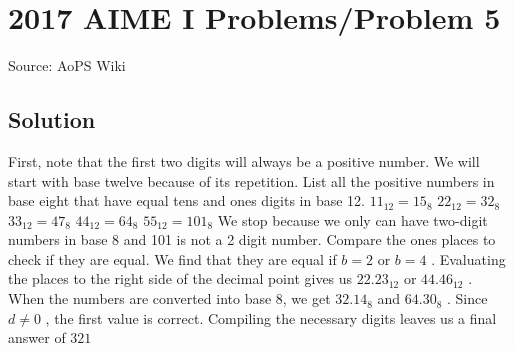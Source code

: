 \documentclass[12pt]{article}
\begin{document}
\section*{{2017 AIME I Problems/Problem 5}}
Source: AoPS Wiki

\subsection*{Solution}
First, note that the first two digits will always be a positive number. We will start with base twelve because of its repetition. List all the positive numbers in base eight that have equal tens and ones digits in base 12. $11_{12}=15_8$ $22_{12}=32_8$ $33_{12}=47_8$ $44_{12}=64_8$ $55_{12}=101_8$ We stop because we only can have two-digit numbers in base 8 and 101 is not a 2 digit number.
Compare the ones places to check if they are equal. We find that they are equal if $b=2$ or $b=4$ .
Evaluating the places to the right side of the decimal point gives us $22.23_{12}$ or $44.46_{12}$ .
When the numbers are converted into base 8, we get $32.14_8$ and $64.30_8$ . Since $d\neq0$ , the first value is correct. Compiling the necessary digits leaves us a final answer of $\boxed{321}$
\end{document}
